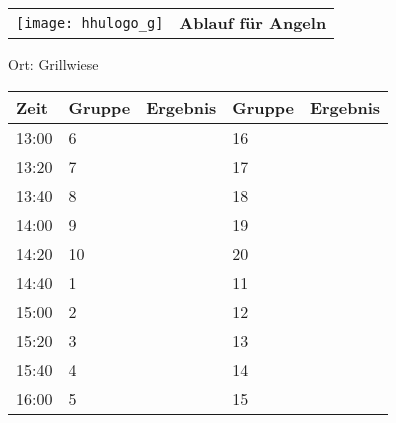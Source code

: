 \documentclass[a4paper,10pt]{article}
\def\spielf{Angeln}
\def\raumf{Grillwiese}
\begin{document}
   \newpage
  \begin{tabularx}{\textwidth}{lc}
    \texttt{[image: hhulogo\_g]}
  & {\Huge \textbf{Ablauf für \spielf}}
  \end{tabularx}
  \LARGE
  \begin{center}
    \vspace{1cm} 
    Ort: \raumf
  \end{center}
    \vspace{2cm} 
    \begin{tabularx}{\textwidth}{X||X|X||X|X}
	\textbf{Zeit} &\textbf{Gruppe} & \textbf{Ergebnis} &\textbf{Gruppe} & \textbf{Ergebnis}  	\\ \hline \hline
	13:00 &	6	&	&16	&	\\ \hline
	13:20 &	7	&	&17	&	\\ \hline
	13:40 &	8	&	&18	&	\\ \hline

	14:00 &	9	&	&19	&	\\ \hline
	14:20 &	10	&	&20	&	\\ \hline
	14:40 &	1	&	&11	&	\\ \hline

	15:00 &	2	&	&12	&	\\ \hline
	15:20 &	3	&	&13	&	\\ \hline
	15:40 &	4	&	&14	&	\\ \hline

	16:00 &	5	&	&15	&	\\ \hline
      
    \end{tabularx}
   
\end{document}
